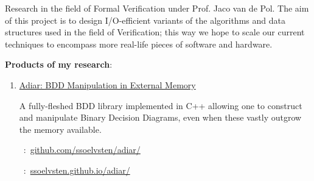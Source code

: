 
Research in the field of Formal Verification under Prof. Jaco van de Pol. The
aim of this project is to design I/O-efficient variants of the algorithms and
data structures used in the field of Verification; this way we hope
to scale our current techniques to encompass more real-life pieces of software
and hardware.

\medskip

\textbf{Products of my research}:

\medskip

\hspace{1em}
\begin{minipage}{29.5em}
  \begin{flushleft}
    \begin{enumerate}
      
    \item[\faCode]
      \href{http://github.com/ssoelvsten/adiar}{Adiar: BDD Manipulation in External Memory}

      \smallskip

      A fully-fleshed BDD library implemented in C++ allowing one to construct
      and manipulate Binary Decision Diagrams, even when these vastly outgrow the
      memory available.

      \smallskip

      \faGit\ :\
      \href{https://github.com/ssoelvsten/adiar/}{github.com/ssoelvsten/adiar/}

      \faFileTextO\ :\
      \href{https://ssoelvsten.github.io/adiar/}{ssoelvsten.github.io/adiar/}
      
    \end{enumerate}
  \end{flushleft}
\end{minipage}

\medskip
